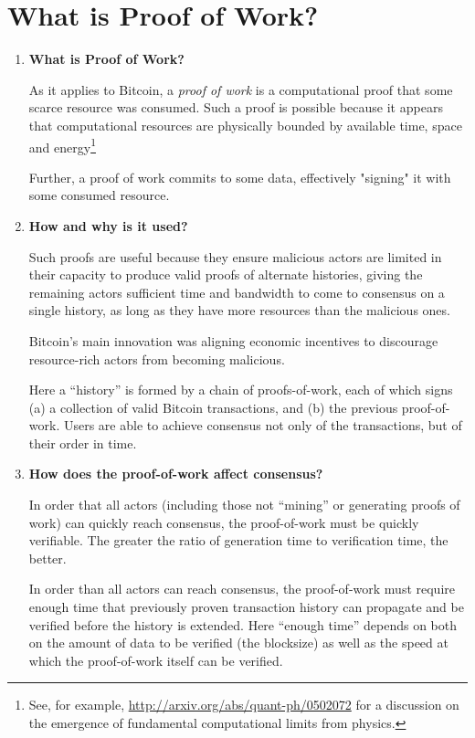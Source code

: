 \documentclass[letterpaper]{article}
\theoremstyle{xxx}
\theoremstyle{evil}
\theoremstyle{yyy}
\theoremstyle{plain}
\theoremstyle{zzz}
\begin{document}
\section{What is Proof of Work?}
\begin{enumerate}
\item \textbf{What is Proof of Work?}

As it applies to Bitcoin, a \emph{proof of work} is a computational proof
that some scarce resource was consumed. Such a proof is possible because
it appears that computational resources are physically bounded by available
time, space and energy\footnote{See, for example, \url{http://arxiv.org/abs/quant-ph/0502072}
for a discussion on the emergence of fundamental computational limits from
physics.}

Further, a proof of work commits to some data, effectively "signing" it
with some consumed resource.

\item \textbf{How and why is it used?}

Such proofs are useful because they ensure malicious actors are limited
in their capacity to produce valid proofs of alternate histories, giving
the remaining actors sufficient time and bandwidth to come to consensus
on a single history, as long as they have more resources than the malicious
ones.

Bitcoin's main innovation was aligning economic incentives to discourage
resource-rich actors from becoming malicious.

Here a ``history'' is formed by a chain of proofs-of-work, each of which
signs (a) a collection of valid Bitcoin transactions, and (b) the previous
proof-of-work. Users are able to achieve consensus not only of the transactions,
but of their order in time.

\item \textbf{How does the proof-of-work affect consensus?}

In order that all actors (including those not ``mining'' or generating proofs
of work) can quickly reach consensus, the proof-of-work must be quickly
verifiable. The greater the ratio of generation time to verification time,
the better.

In order than all actors can reach consensus, the proof-of-work must require
enough time that previously proven transaction history can propagate and be
verified before the history is extended. Here ``enough time'' depends on
both on the amount of data to be verified (the blocksize) as well as the
speed at which the proof-of-work itself can be verified.


\end{enumerate}
\end{document}
